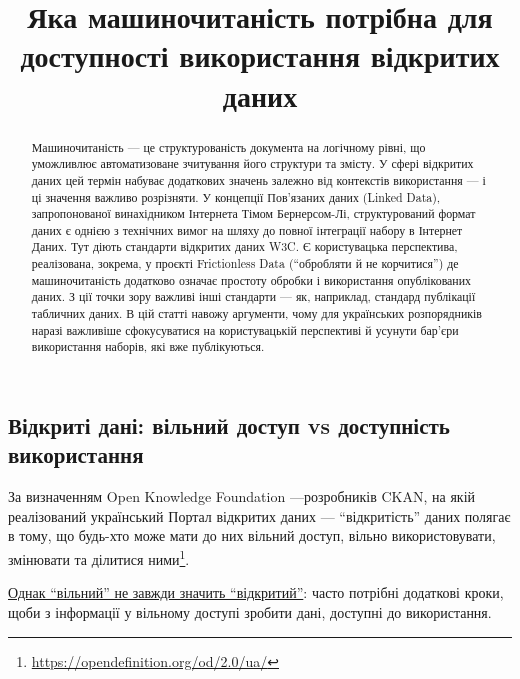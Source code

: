 \documentclass[
]{agujournal2019}
\begin{document}
\title{Яка машиночитаність потрібна для доступності використання
відкритих даних}



\begin{abstract}
Машиночитаність --- це структурованість документа на логічному рівні, що
уможливлює автоматизоване зчитування його структури та змісту. У сфері
відкритих даних цей термін набуває додаткових значень залежно від
контекстів використання --- і ці значення важливо розрізняти. У
концепції Пов'язаних даних (Linked Data), запропонованої винахідником
Інтернета Тімом Бернерсом-Лі, структурований формат даних є однією з
технічних вимог на шляху до повної інтеграції набору в Інтернет Даних.
Тут діють стандарти відкритих даних W3C. Є користувацька перспектива,
реалізована, зокрема, у проєкті Frictionless Data (``обробляти й не
корчитися'') де машиночитаність додатково означає простоту обробки і
використання опублікованих даних. З ції точки зору важливі інші
стандарти --- як, наприклад, стандард публікації табличних даних. В цій
статті навожу аргументи, чому для українських розпорядників наразі
важливіше сфокусуватися на користувацькій перспективі й усунути бар'єри
використання наборів, які вже публікуються.
\end{abstract}





\subsection{Відкриті дані: вільний доступ vs доступність
використання}\label{ux432ux456ux434ux43aux440ux438ux442ux456-ux434ux430ux43dux456-ux432ux456ux43bux44cux43dux438ux439-ux434ux43eux441ux442ux443ux43f-vs-ux434ux43eux441ux442ux443ux43fux43dux456ux441ux442ux44c-ux432ux438ux43aux43eux440ux438ux441ux442ux430ux43dux43dux44f}

За визначенням Open Knowledge Foundation ---розробників CKAN, на якій
реалізований український Портал відкритих даних --- ``відкритість''
даних полягає в тому, що будь-хто може мати до них вільний доступ,
вільно використовувати, змінювати та ділитися ними\footnote{\url{https://opendefinition.org/od/2.0/ua/}}.

\href{https://aims.gitbook.io/open-data-mooc/unit-1-open-data-principles/lesson-1.1-what-is-open-data\#id-5.-challenges}{Однак
``вільний'' не завжди значить ``відкритий''}: часто потрібні додаткові
кроки, щоби з інформації у вільному доступі зробити дані, доступні до
використання.
\end{document}
